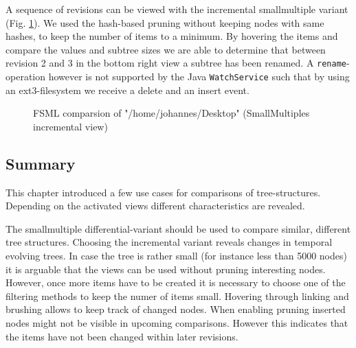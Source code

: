 A sequence of revisions can be viewed with the incremental smallmultiple variant (Fig. \ref{fig:fsml-smallmultiples-incremental}). We used the hash-based pruning without keeping nodes with same hashes, to keep the number of items to a minimum. By hovering the items and compare the values and subtree sizes we are able to determine that between revision 2 and 3 in the bottom right view a subtree has been renamed. A \texttt{rename}-operation however is not supported by the Java \texttt{WatchService} such that by using an ext3-filesystem we receive a delete and an insert event.

\begin{figure}[htb]
\caption{\label{fig:fsml-smallmultiples-incremental} FSML comparsion of "/home/johannes/Desktop" (SmallMultiples incremental view)}
\end{figure}

\subsection{Summary}
This chapter introduced a few use cases for comparisons of tree-structures. Depending on the activated views different characteristics are revealed. 

The smallmultiple differential-variant should be used to compare similar, different tree structures. Choosing the incremental variant reveals changes in temporal evolving trees. In case the tree is rather small (for instance less than 5000 nodes) it is arguable that the views can be used without pruning interesting nodes. However, once more items have to be created it is necessary to choose one of the filtering methods to keep the numer of items small. Hovering through linking and brushing allows to keep track of changed nodes. When enabling pruning inserted nodes might not be visible in upcoming comparisons. However this indicates that the items have not been changed within later revisions. 

